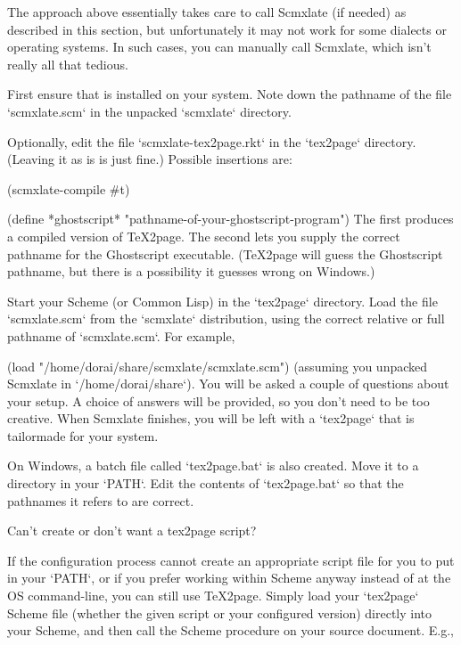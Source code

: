 The  approach above
essentially takes care to call Scmxlate (if needed) as described in
this section, but unfortunately it may not work for
some dialects or operating systems.  In such cases, you
can manually call Scmxlate, which isn’t really all that
tedious.

First ensure that
is installed on your system.  Note down the pathname of
the file `scmxlate.scm` in the unpacked `scmxlate`
directory.

Optionally, edit the file `scmxlate-tex2page.rkt` in the
`tex2page` directory. (Leaving it as is is just fine.)
Possible insertions are:

\begintts
(scmxlate-compile #t)

(define *ghostscript* "pathname-of-your-ghostscript-program")
\endtt
%
The first produces a compiled version of
\TeX2page.   The second lets you supply the
correct pathname for the Ghostscript executable.
(\TeX2page will guess the Ghostscript pathname,
but there is a possibility it guesses wrong on
Windows.)

Start your Scheme (or Common Lisp) in the
`tex2page` directory.   Load the file
`scmxlate.scm` from the
`scmxlate` distribution, using the correct relative
or full pathname of `scmxlate.scm`.  For example,

\begintts
(load "/home/dorai/share/scmxlate/scmxlate.scm")
\endtt
%
(assuming you unpacked Scmxlate in
`/home/dorai/share`).  You will be asked a couple
of questions about your setup.  A choice of answers
will be provided, so you don’t need to be too creative.
When Scmxlate finishes, you will be left with a
`tex2page` that is tailormade for your system.

On Windows, a batch file called `tex2page.bat`
is also created.  Move it to a directory in your
`PATH`.  Edit the contents of `tex2page.bat` so
that the pathnames it refers to are correct.

\beginsection Can’t create or don’t want a {tex2page
script?}

If the configuration process cannot create an
appropriate script file for you to put in your
`PATH`, or if you prefer working within Scheme
anyway instead of at the OS command-line,
you can still use \TeX2page.  Simply load
your `tex2page` Scheme file
(whether the given script or your configured version)
directly into
your Scheme, and then call the Scheme
procedure  on your source document.  E.g.,

